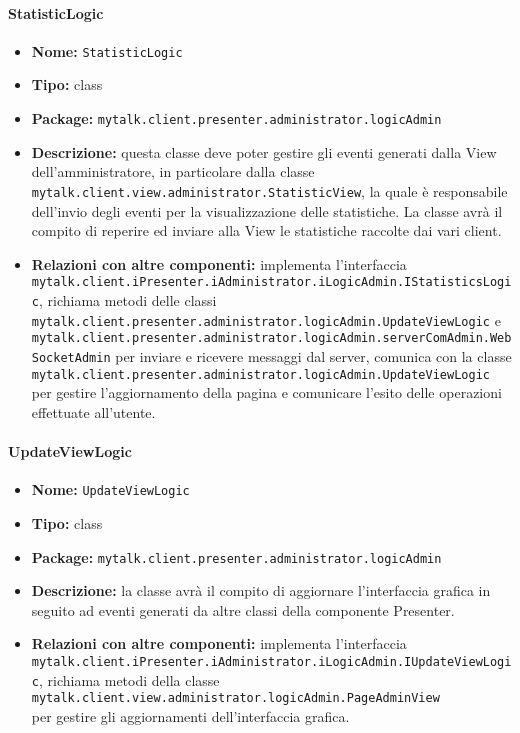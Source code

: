 \paragraph{StatisticLogic}{
	\begin{itemize}
		\item [] \textbf{Nome:} \texttt{StatisticLogic}
		\item [] \textbf{Tipo:} class
		\item [] \textbf{Package:} \texttt{mytalk.client.presenter.administrator.logicAdmin}
		\item [] \textbf{Descrizione:} questa classe deve poter gestire gli eventi generati dalla View dell'amministratore, in particolare dalla classe \\ \texttt{mytalk.client.view.administrator.StatisticView}, la quale è responsabile dell'invio degli eventi per la visualizzazione delle statistiche. La classe avrà il compito di reperire ed inviare alla View le statistiche raccolte dai vari client\g.
		\item [] \textbf{Relazioni con altre componenti:} implementa l'interfaccia\\ \texttt{mytalk.client.iPresenter.iAdministrator.iLogicAdmin.IStatisticsLogic}, richiama metodi delle classi \\ \texttt{mytalk.client.presenter.administrator.logicAdmin.UpdateViewLogic} e \\ \texttt{mytalk.client.presenter.administrator.logicAdmin.serverComAdmin.WebSocketAdmin} per inviare e ricevere messaggi dal server\g , comunica con la classe\\ \texttt{mytalk.client.presenter.administrator.logicAdmin.UpdateViewLogic}\\ per gestire l'aggiornamento della pagina e comunicare l'esito delle operazioni effettuate all'utente.
	\end{itemize}
}

\paragraph{UpdateViewLogic}{
	\begin{itemize}
		\item [] \textbf{Nome:} \texttt{UpdateViewLogic}
		\item [] \textbf{Tipo:} class
		\item [] \textbf{Package:} \texttt{mytalk.client.presenter.administrator.logicAdmin}
		\item [] \textbf{Descrizione:} la classe avrà il compito di aggiornare l'interfaccia grafica in seguito ad eventi generati da altre classi della componente Presenter.
		\item [] \textbf{Relazioni con altre componenti:} implementa l'interfaccia\\ \texttt{mytalk.client.iPresenter.iAdministrator.iLogicAdmin.IUpdateViewLogic}, richiama metodi della classe\\ \texttt{mytalk.client.view.administrator.logicAdmin.PageAdminView}\\ per gestire gli aggiornamenti dell'interfaccia grafica.
	\end{itemize}
}

